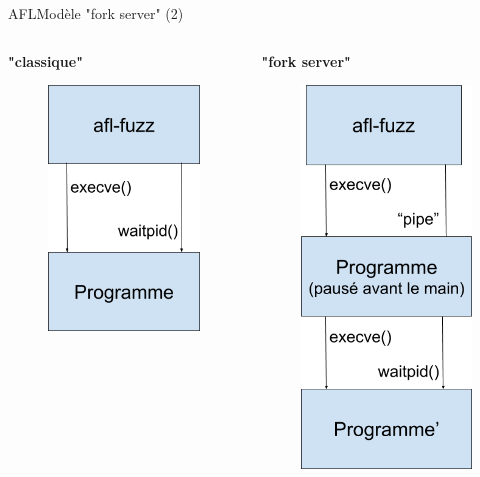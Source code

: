 \begin{frame}{AFL}{Modèle "fork server" (2)}
  \begin{columns}[t]
    \begin{column}{0.5\textwidth}
      \begin{center}
        \textbf{"classique"}
      \end{center}

      \bigskip
      \begin{figure}
        \includegraphics[width=.4\textwidth]{../medias/classique.png}
      \end{figure}
    \end{column}

    \begin{column}{0.5\textwidth}
      \begin{center}
        \textbf{"fork server"}
      \end{center}

      \begin{figure}
        \includegraphics[width=.4\textwidth]{../medias/fork-server.png}
      \end{figure}
    \end{column}
  \end{columns}
\end{frame}
